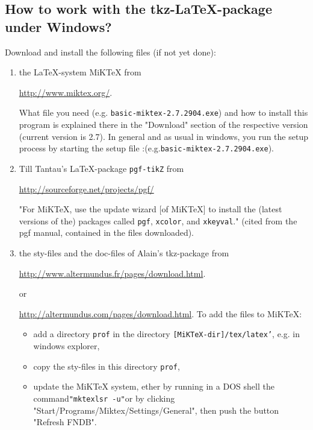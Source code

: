 \documentclass[DIV=14,
               fontsize=10,
               headinclude=false,
               index=totoc,
               footinclude=false,
               headings=small]{tkz-doc}
\begin{document}

\subsection{How to work with the tkz-\LaTeX-package under Windows?}
Download and install the following files (if not yet done):
\begin{enumerate}

  \item the \LaTeX-system MiKTeX from

      \url{http://www.miktex.org/}.

      What file you need (e.g.
      \texttt{basic-miktex-2.7.2904.exe}) and how to install
      this program is explained there in the "Download"
      section of the respective version (current version is
      2.7). In general and as usual in windows, you run the
      setup process by starting the setup file :\newline (e.g.\texttt{basic-miktex-2.7.2904.exe}).

  \item Till Tantau's \LaTeX-package \texttt{pgf-tikZ} from

      \url{http://sourceforge.net/projects/pgf/}

      "For MiKTeX, use the update wizard [of MiKTeX] to
      install the (latest versions of the) packages called
      \texttt{pgf}, \texttt{xcolor}, and \texttt{xkeyval}."
      (cited from the pgf manual, contained in the files
      downloaded).
       \item the sty-files and the doc-files of Alain's tkz-package
            from

            \url{http://www.altermundus.fr/pages/download.html}.
    
      or
      
      \url{http://altermundus.com/pages/download.html}.
            To add the files to MiKTeX:

            \begin{itemize}
              \item add a directory \texttt{prof} in the
                  directory \texttt{[MiKTeX-dir]/tex/latex'},
                  e.g. in windows explorer,
              \item copy the sty-files in this directory
                  \texttt{prof},
              \item update the MiKTeX system, ether by running
                  in a DOS shell the command\newline\texttt{"mktexlsr
                  -u"}\newline or by clicking\newline
                  "Start/Programs/Miktex/Settings/General", then
                  push the button "Refresh FNDB".
            \end{itemize}
      \end{enumerate}
\end{document}
